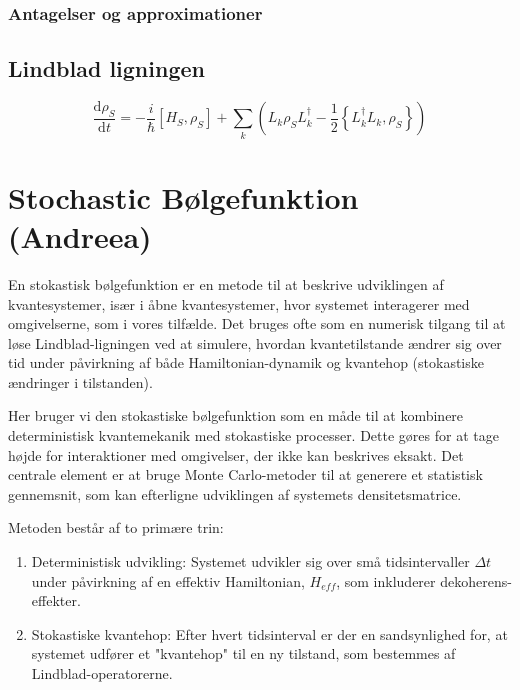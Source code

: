 \documentclass[danish,a4paper,oneside,onecolumn,article,11pt]{memoir}
\begin{document}
\subsection{Antagelser og approximationer}

\section{Lindblad ligningen}
\begin{equation}\label{eq:lindblad}
    \frac{\text{d}\rho_S}{\text{d}t}=-\frac{i}{\hbar}\left[H_S,\rho_S\right]+\sum_k\left(L_k\rho_S L_k^\dagger-\frac{1}{2}\left\{L_k^\dagger L_k,\rho_S\right\}\right)
\end{equation}


\chapter{Stochastic Bølgefunktion (Andreea)}
En stokastisk bølgefunktion er en metode til at beskrive udviklingen af kvantesystemer, især i åbne kvantesystemer, hvor systemet interagerer med omgivelserne, som i vores tilfælde. Det bruges ofte som en numerisk tilgang til at løse Lindblad-ligningen ved at simulere, hvordan kvantetilstande ændrer sig over tid under påvirkning af både Hamiltonian-dynamik og kvantehop (stokastiske ændringer i tilstanden). 

Her bruger vi den stokastiske bølgefunktion som en måde til at kombinere deterministisk kvantemekanik med stokastiske processer. Dette gøres for at tage højde for interaktioner med omgivelser, der ikke kan beskrives eksakt. Det centrale element er at bruge Monte Carlo-metoder til at generere et statistisk gennemsnit, som kan efterligne udviklingen af systemets densitetsmatrice.

Metoden består af to primære trin:
\begin{enumerate}
    \item 
    Deterministisk udvikling: Systemet udvikler sig over små tidsintervaller $Δt$ under påvirkning af en effektiv Hamiltonian, $H_{eff}$, som inkluderer dekoherens-effekter.
    \item
    Stokastiske kvantehop: Efter hvert tidsinterval er der en sandsynlighed for, at systemet udfører et "kvantehop" til en ny tilstand, som bestemmes af Lindblad-operatorerne.
\end{enumerate}
\end{document}

